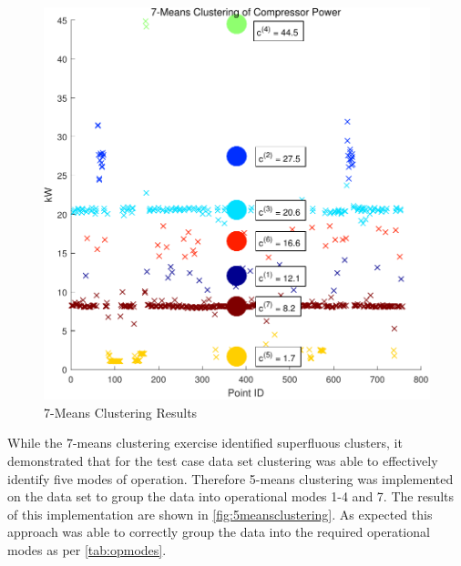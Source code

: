 \begin{figure}
\includegraphics[width = \columnwidth]{./Images/7MeansClustering.pdf}
\caption{7-Means Clustering Results}
\label{fig:7meansclustering}
\end{figure}

While the 7-means clustering exercise identified superfluous clusters, it demonstrated that for the test case data set clustering was able to effectively identify five modes of operation. Therefore 5-means clustering was implemented on the data set to group the data into operational modes 1-4 and 7. The results of this implementation are shown in \autoref{fig:5meansclustering}. As expected this approach was able to correctly group the data into the required operational modes as per \autoref{tab:opmodes}.

